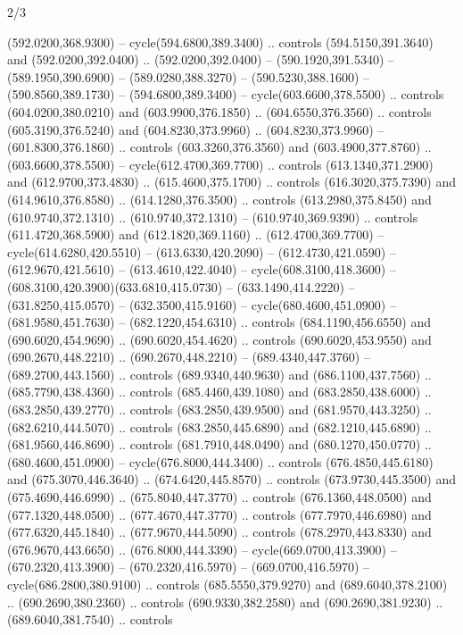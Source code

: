 \begin{flagdescription}{2/3}
\begin{scope}[xshift=0.5\flaglength,yshift=0.5\flagwidth,scale=\flagwidth/638.38]
\begin{scope}[y=0.80pt, x=0.80pt, yscale=-1,shift={(-600,-400)}]
\begin{scope}[shift={(-0.02,2.173)}]
  (592.0200,368.9300) -- cycle(594.6800,389.3400) .. controls
  (594.5150,391.3640) and (592.0200,392.0400) .. (592.0200,392.0400) --
  (590.1920,391.5340) -- (589.1950,390.6900) -- (589.0280,388.3270) --
  (590.5230,388.1600) -- (590.8560,389.1730) -- (594.6800,389.3400) --
  cycle(603.6600,378.5500) .. controls (604.0200,380.0210) and
  (603.9900,376.1850) .. (604.6550,376.3560) .. controls (605.3190,376.5240) and
  (604.8230,373.9960) .. (604.8230,373.9960) -- (601.8300,376.1860) .. controls
  (603.3260,376.3560) and (603.4900,377.8760) .. (603.6600,378.5500) --
  cycle(612.4700,369.7700) .. controls (613.1340,371.2900) and
  (612.9700,373.4830) .. (615.4600,375.1700) .. controls (616.3020,375.7390) and
  (614.9610,376.8580) .. (614.1280,376.3500) .. controls (613.2980,375.8450) and
  (610.9740,372.1310) .. (610.9740,372.1310) -- (610.9740,369.9390) .. controls
  (611.4720,368.5900) and (612.1820,369.1160) .. (612.4700,369.7700) --
  cycle(614.6280,420.5510) -- (613.6330,420.2090) -- (612.4730,421.0590) --
  (612.9670,421.5610) -- (613.4610,422.4040) -- cycle(608.3100,418.3600) --
  (608.3100,420.3900)(633.6810,415.0730) -- (633.1490,414.2220) --
  (631.8250,415.0570) -- (632.3500,415.9160) -- cycle(680.4600,451.0900) --
  (681.9580,451.7630) -- (682.1220,454.6310) .. controls (684.1190,456.6550) and
  (690.6020,454.9690) .. (690.6020,454.4620) .. controls (690.6020,453.9550) and
  (690.2670,448.2210) .. (690.2670,448.2210) -- (689.4340,447.3760) --
  (689.2700,443.1560) .. controls (689.9340,440.9630) and (686.1100,437.7560) ..
  (685.7790,438.4360) .. controls (685.4460,439.1080) and (683.2850,438.6000) ..
  (683.2850,439.2770) .. controls (683.2850,439.9500) and (681.9570,443.3250) ..
  (682.6210,444.5070) .. controls (683.2850,445.6890) and (682.1210,445.6890) ..
  (681.9560,446.8690) .. controls (681.7910,448.0490) and (680.1270,450.0770) ..
  (680.4600,451.0900) -- cycle(676.8000,444.3400) .. controls
  (676.4850,445.6180) and (675.3070,446.3640) .. (674.6420,445.8570) .. controls
  (673.9730,445.3500) and (675.4690,446.6990) .. (675.8040,447.3770) .. controls
  (676.1360,448.0500) and (677.1320,448.0500) .. (677.4670,447.3770) .. controls
  (677.7970,446.6980) and (677.6320,445.1840) .. (677.9670,444.5090) .. controls
  (678.2970,443.8330) and (676.9670,443.6650) .. (676.8000,444.3390) --
  cycle(669.0700,413.3900) -- (670.2320,413.3900) -- (670.2320,416.5970) --
  (669.0700,416.5970) -- cycle(686.2800,380.9100) .. controls
  (685.5550,379.9270) and (689.6040,378.2100) .. (690.2690,380.2360) .. controls
  (690.9330,382.2580) and (690.2690,381.9230) .. (689.6040,381.7540) .. controls

\end{scope}
\end{scope}
\end{scope}
\end{flagdescription}
